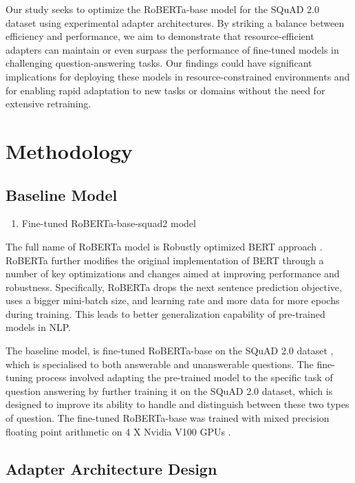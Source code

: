 \documentclass[conference]{IEEEtran}
\begin{document}
Our study seeks to optimize the RoBERTa-base model for the SQuAD 2.0 dataset using experimental adapter architectures. By striking a balance between efficiency and performance, we aim to demonstrate that resource-efficient adapters can maintain or even surpass the performance of fine-tuned models in challenging question-answering tasks. Our findings could have significant implications for deploying these models in resource-constrained environments and for enabling rapid adaptation to new tasks or domains without the need for extensive retraining.

\section{Methodology}

\subsection{Baseline Model}

\begin{enumerate}
    \item Fine-tuned RoBERTa-base-squad2 model
\end{enumerate}

The full name of RoBERTa model is Robustly optimized BERT approach \cite{b4}. RoBERTa further modifies the original implementation of BERT through a number of key optimizations and changes aimed at improving performance and robustness. Specifically, RoBERTa drops the next sentence prediction objective, uses a bigger mini-batch size, and learning rate and more data for more epochs during training. This leads to better generalization capability of pre-trained models in NLP.

The baseline model, is fine-tuned RoBERTa-base on the SQuAD 2.0 dataset \cite{b16}, which is specialised to both answerable and unanswerable questions. The fine-tuning process involved adapting the pre-trained model to the specific task of question answering by further training it on the SQuAD 2.0 dataset, which is designed to improve its ability to handle and distinguish between these two types of question.
The fine-tuned RoBERTa-base was trained with mixed precision floating point arithmetic on 4 X Nvidia V100 GPUs \cite{b16}.

\subsection{Adapter Architecture Design}
\end{document}
